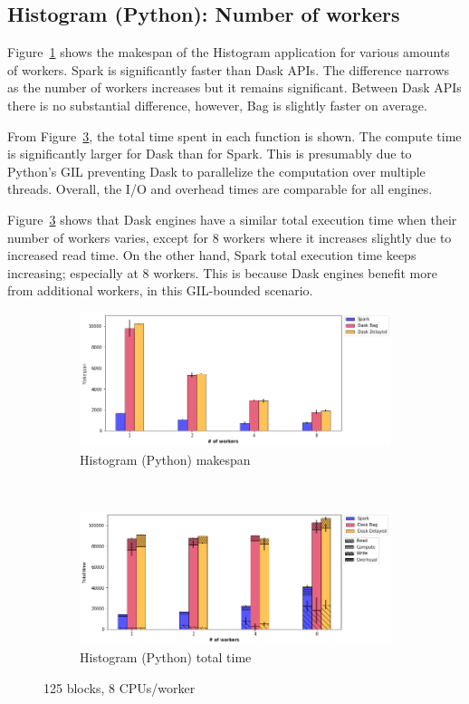 \documentclass[conference]{IEEEtran}
\begin{document}
\subsection{Histogram (Python): Number of workers}
Figure~\ref{fig:histo_ms_worker} shows the makespan of the Histogram application for various
amounts of workers. Spark is significantly faster than Dask APIs. The difference
narrows as the number of workers increases but it remains significant. Between Dask APIs
there is no substantial difference, however, Bag is slightly faster on average.

From Figure~\ref{fig:histo_tt_worker}, the total time spent in each function is
shown. The compute time is significantly larger for Dask than for Spark. This is
presumably due to Python's GIL preventing Dask to parallelize the computation
over
multiple threads. Overall, the I/O and overhead times are comparable for all engines.

Figure~\ref{fig:histo_tt_worker} shows that Dask engines have a similar
total execution time when their number of workers varies, except for 8
workers where it increases slightly due to increased read time.
On the other hand, Spark total execution time keeps increasing; especially at 8
workers. This is because Dask engines benefit more from additional workers, in
this GIL-bounded scenario.

\begin{figure}[!b]
    \centering
    \begin{subfigure}[b]{\columnwidth}
        \includegraphics[clip,width=\columnwidth]{images/histo_worker.png}%
        \caption{Histogram (Python) makespan}\label{fig:histo_ms_worker}
    \end{subfigure}
    \\
    \begin{subfigure}[b]{\columnwidth}
        \includegraphics[clip,width=\columnwidth]{images/histo_idle_worker.png}%
        \caption{Histogram (Python) total time}\label{fig:histo_tt_worker}
    \end{subfigure}
    \caption{125 blocks, 8 CPUs/worker}
\end{figure}
\end{document}
